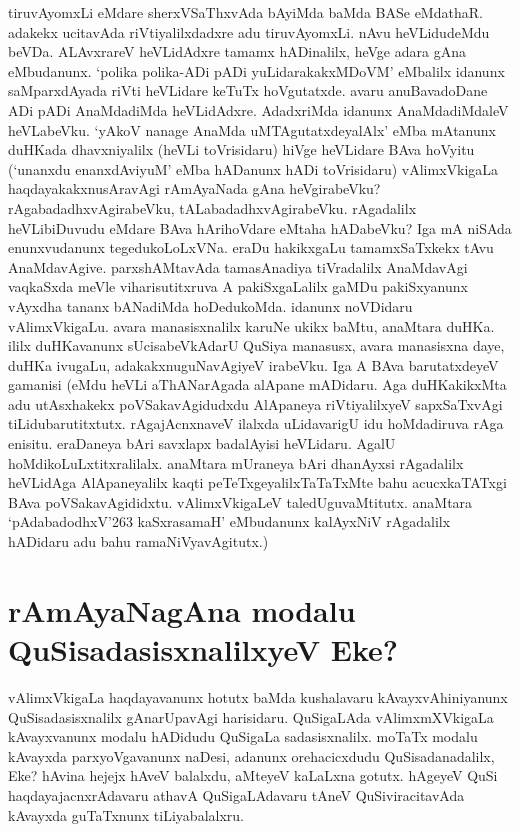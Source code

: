 tiruvAyomxLi eMdare sherxVSaThxvAda bAyiMda baMda BASe eMdathaR. adakekx ucitavAda riVtiyalilxdadxre adu tiruvAyomxLi. nAvu heVLidudeMdu beVDa. ALAvxrareV heVLidAdxre tamamx hADinalilx, heVge adara gAna eMbudanunx. `polika polika-ADi pADi yuLidarakakxMDoVM' eMbalilx idanunx saMparxdAyada riVti heVLidare keTuTx hoVgutatxde. avaru anuBavadoDane ADi pADi AnaMdadiMda heVLidAdxre. AdadxriMda idanunx AnaMdadiMdaleV heVLabeVku. `yAkoV nanage AnaMda uMTAgutatxdeyalAlx' eMba mAtanunx duHKada dhavxniyalilx (heVLi toVrisidaru) hiVge heVLidare BAva hoVyitu (`unanxdu enanxdAviyuM' eMba hADanunx hADi toVrisidaru) vAlimxVkigaLa haqdayakakxnusAravAgi rAmAyaNada gAna heVgirabeVku? rAgabadadhxvAgirabeVku, tALabadadhxvAgirabeVku. rAgadalilx heVLibiDuvudu eMdare BAva hArihoVdare eMtaha hADabeVku? Iga mA niSAda enunxvudanunx tegedukoLoLxVNa. eraDu hakikxgaLu tamamxSaTxkekx tAvu AnaMdavAgive. parxshAMtavAda tamasAnadiya tiVradalilx AnaMdavAgi vaqkaSxda meVle viharisutitxruva A pakiSxgaLalilx gaMDu pakiSxyanunx vAyxdha tananx bANadiMda hoDedukoMda. idanunx noVDidaru vAlimxVkigaLu. avara manasisxnalilx karuNe ukikx baMtu, anaMtara duHKa. ililx duHKavanunx sUcisabeVkAdarU QuSiya manasusx, avara manasisxna daye, duHKa ivugaLu, adakakxnuguNavAgiyeV irabeVku. Iga A BAva barutatxdeyeV gamanisi (eMdu heVLi aThANarAgada alApane mADidaru. Aga duHKakikxMta adu utAsxhakekx poVSakavAgidudxdu AlApaneya riVtiyalilxyeV sapxSaTxvAgi tiLidubarutitxtutx. rAgajAcnxnaveV ilalxda uLidavarigU idu hoMdadiruva rAga enisitu. eraDaneya bAri savxlapx badalAyisi heVLidaru. AgalU hoMdikoLuLxtitxralilalx. anaMtara mUraneya bAri dhanAyxsi rAgadalilx heVLidAga AlApaneyalilx kaqti peTeTxgeyalilxTaTaTxMte bahu acucxkaTATxgi BAva poVSakavAgididxtu. vAlimxVkigaLeV taledUguvaMtitutx. anaMtara `pAdabadodhxV\char'263 kaSxrasamaH'\label{242} eMbudanunx kalAyxNiV rAgadalilx hADidaru adu bahu ramaNiVyavAgitutx.)


\section*{rAmAyaNagAna modalu QuSisadasisxnalilxyeV Eke?}

vAlimxVkigaLa haqdayavanunx hotutx baMda kushalavaru kAvayxvAhiniyanunx QuSisadasisxnalilx gAnarUpavAgi harisidaru. QuSigaLAda vAlimxmXVkigaLa kAvayxvanunx modalu hADidudu QuSigaLa sadasisxnalilx. moTaTx modalu kAvayxda parxyoVgavanunx naDesi, adanunx orehacicxdudu QuSisadanadalilx, Eke? hAvina hejejx hAveV balalxdu, aMteyeV kaLaLxna gotutx. hAgeyeV  QuSi haqdayajacnxrAdavaru athavA QuSigaLAdavaru tAneV QuSiviracitavAda kAvayxda guTaTxnunx tiLiyabalalxru. 

